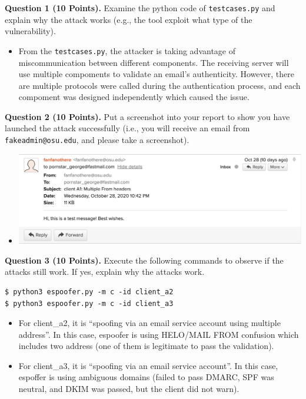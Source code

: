 \documentclass[11pt]{article}
\newcommand{\dmark}{{\sf DMARC}\xspace}
\newcommand{\dkim}{{\sf DKIM}\xspace}
\newcommand{\spf}{{\sf SPF}\xspace}
\begin{document}
\begin{enumerate}
\textbf{Question 1 (10 Points).} Examine the python code of \texttt{testcases.py} and explain why the attack works (e.g., the tool exploit what type of the vulnerability).

\begin{itemize}
  \item From the \texttt{testcases.py}, the attacker is taking advantage of miscommunication between different components. The receiving server will use multiple compoments to validate an email's authenticity. However, there are multiple protocols were called during the authentication process, and each compoment was designed independently which caused the issue.
\end{itemize}

\textbf{Question 2 (10 Points).} Put a screenshot into your report to show you have launched the attack successfully (i.e., you will receive an email from \texttt{fakeadmin@osu.edu}, and please take a screenshot).

\begin{itemize}
  \item \includegraphics[width=0.88\columnwidth]{a1.png}
\end{itemize}

\textbf{Question 3 (10 Points).} Execute the following commands to observe if the attacks still work.  If yes, explain why the attacks work.

\begin{lstlisting}
$ python3 espoofer.py -m c -id client_a2
$ python3 espoofer.py -m c -id client_a3
\end{lstlisting}\vspace{-6mm}

\begin{itemize}
  \item For client\_a2, it is ``spoofing via an email service account using multiple address''. In this case, espoofer is using HELO/MAIL FROM confusion which includes two address (one of them is legitimate to pass the validation).
  \item For client\_a3, it is ``spoofing via an email service account''. In this case, espoffer is using ambiguous domains (failed to pass \dmark, \spf was neutral, and \dkim was passed, but the client did not warn).
\end{itemize}


\end{enumerate}
\end{document}
